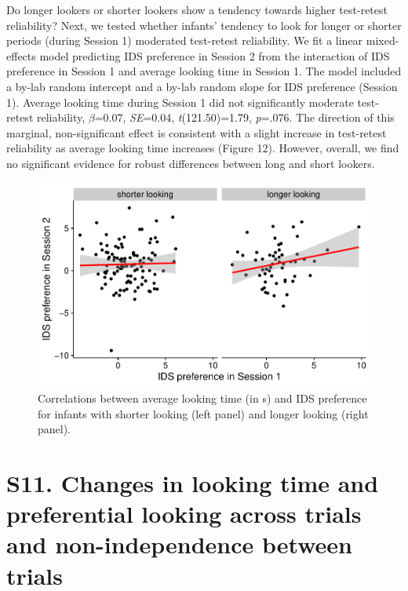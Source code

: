 \documentclass[
  man, donotrepeattitle,floatsintext]{apa6}
\begin{document}
Do longer lookers or shorter lookers show a tendency towards higher test-retest reliability?
Next, we tested whether infants' tendency to look for longer or shorter periods (during Session 1) moderated test-retest reliability.
We fit a linear mixed-effects model predicting IDS preference in Session 2 from the interaction of IDS preference in Session 1 and average looking time in Session 1. The model included a by-lab random intercept and a by-lab random slope for IDS preference (Session 1). Average looking time during Session 1 did not significantly moderate test-retest reliability, \(\beta\)=0.07, \emph{SE}=0.04, \emph{t}(121.50)=1.79, \emph{p}=.076. The direction of this marginal, non-significant effect is consistent with a slight increase in test-retest reliability as average looking time increases (Figure 12). However, overall, we find no significant evidence for robust differences between long and short lookers.

\begin{figure}

{\centering \includegraphics{MB1T_supplement_files/figure-latex/fig12-1} 

}

\caption{Correlations between average looking time (in s) and IDS preference for infants with shorter looking (left panel) and longer looking (right panel).}\label{fig:fig12}
\end{figure}

\hypertarget{s11.-changes-in-looking-time-and-preferential-looking-across-trials-and-non-independence-between-trials}{%
\section{S11. Changes in looking time and preferential looking across trials and non-independence between trials}\label{s11.-changes-in-looking-time-and-preferential-looking-across-trials-and-non-independence-between-trials}}
\end{document}
